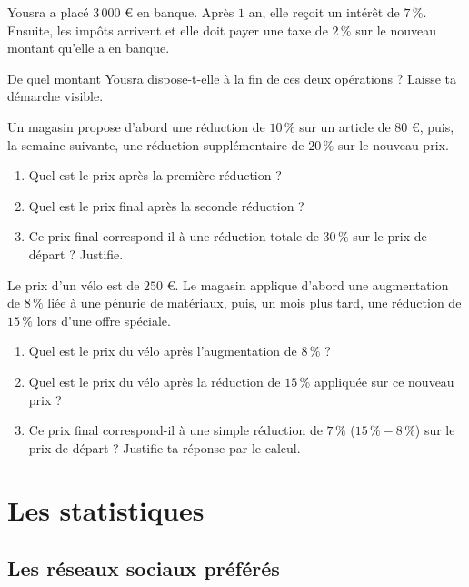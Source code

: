 \documentclass[../../syllabus_1.tex]{subfiles}
\begin{document}
\begin{exercise}
    Yousra a placé $3\,000$ € en banque. Après $1$ an, elle reçoit un intérêt de $7\,\%$. Ensuite, les impôts arrivent et elle doit payer une taxe de $2\,\%$ sur le nouveau montant qu'elle a en banque.

    De quel montant Yousra dispose-t-elle à la fin de ces deux opérations ? Laisse ta démarche visible.
    \vspace{3cm}
\end{exercise}

\begin{exercise}
    Un magasin propose d'abord une réduction de $10\,\%$ sur un article de $80$ €, puis, la semaine suivante, une réduction supplémentaire de $20\,\%$ sur le nouveau prix.
    \begin{enumerate}[itemsep=1cm]
        \item Quel est le prix après la première réduction ?
        \item Quel est le prix final après la seconde réduction ?
        \item Ce prix final correspond-il à une réduction totale de $30\,\%$ sur le prix de départ ? Justifie.
    \end{enumerate}
    \vspace{1cm}
\end{exercise}

\begin{exercise}
    Le prix d'un vélo est de $250$ €. Le magasin applique d'abord une augmentation de $8\,\%$ liée à une pénurie de matériaux, puis, un mois plus tard, une réduction de $15\,\%$ lors d'une offre spéciale.
    \begin{enumerate}[itemsep=1cm]
        \item Quel est le prix du vélo après l'augmentation de $8\,\%$ ?
        \item Quel est le prix du vélo après la réduction de $15\,\%$ appliquée sur ce nouveau prix ?
        \item Ce prix final correspond-il à une simple réduction de $7\,\%$ ($15\,\% - 8\,\%$) sur le prix de départ ? Justifie ta réponse par le calcul.
    \end{enumerate}
\end{exercise}

\newpage
\section{Les statistiques}
\subsection{Les réseaux sociaux préférés}
\end{document}
